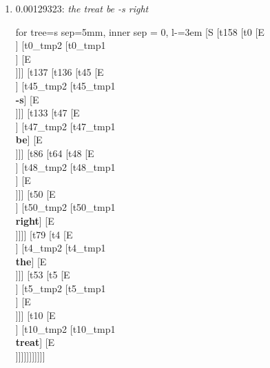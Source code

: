 \documentclass[11pt]{article}
\begin{document}
\begin{enumerate}
	\item  0.00129323: \textit{the treat be -s right} \\[0.5em]
	\begin{forest}
	for tree={s sep=5mm, inner sep = 0, l-=3em}
	[S [t158 [t0 [E\\ ] [t0_tmp2 [t0_tmp1\\ ] [E\\ ]]] [t137 [t136 [t45 [E\\ ] [t45_tmp2 [t45_tmp1\\\textbf{-s}] [E\\ ]]] [t133 [t47 [E\\ ] [t47_tmp2 [t47_tmp1\\\textbf{be}] [E\\ ]]] [t86 [t64 [t48 [E\\ ] [t48_tmp2 [t48_tmp1\\ ] [E\\ ]]] [t50 [E\\ ] [t50_tmp2 [t50_tmp1\\\textbf{right}] [E\\ ]]]] [t79 [t4 [E\\ ] [t4_tmp2 [t4_tmp1\\\textbf{the}] [E\\ ]]] [t53 [t5 [E\\ ] [t5_tmp2 [t5_tmp1\\ ] [E\\ ]]] [t10 [E\\ ] [t10_tmp2 [t10_tmp1\\\textbf{treat}] [E\\ ]]]]]]]]]]]
	\end{forest}
	\newpage


\end{enumerate}
\end{document}

